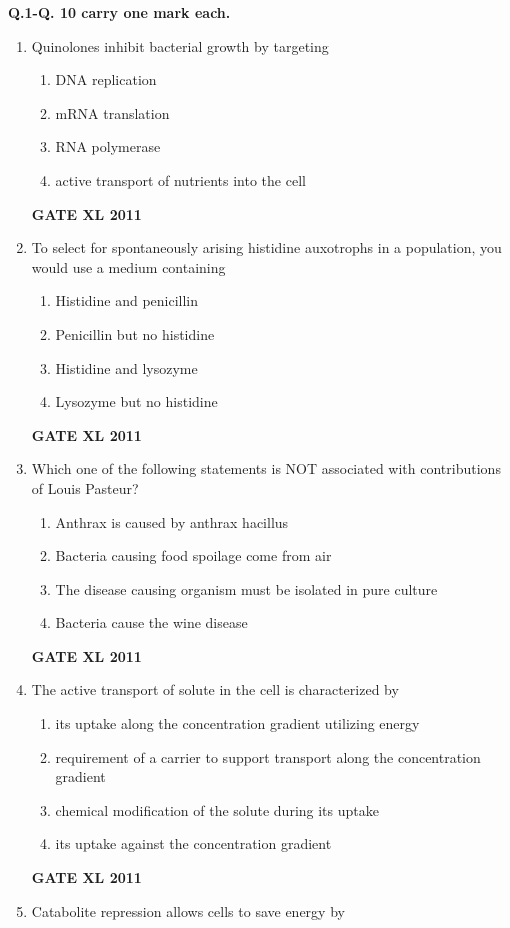 \documentclass[journal,12pt,onecolumn]{IEEEtran}
\begin{document}
\textbf{Q.1-Q. 10 carry one mark each.}
\begin{enumerate}
\item {Quinolones inhibit bacterial growth by targeting}
		\begin{enumerate}
			\item DNA replication
			\item mRNA translation
			\item RNA polymerase
			\item active transport of nutrients into the cell
		\end{enumerate}
		\hfill{\textbf{GATE XL 2011}}
\item {To select for spontaneously arising histidine auxotrophs in a population, you would use a medium containing}
		\begin{enumerate}
			\item Histidine and penicillin
			\item Penicillin but no histidine
			\item Histidine and lysozyme
			\item Lysozyme but no histidine
		\end{enumerate}
		\hfill{\textbf{GATE XL 2011}}
\item {Which one of the following statements is NOT associated with contributions of Louis Pasteur?}
		\begin{enumerate}
			\item Anthrax is caused by anthrax hacillus
			\item Bacteria causing food spoilage come from air
			\item The disease causing organism must be isolated in pure culture
			\item Bacteria cause the wine disease
		\end{enumerate}
		\hfill{\textbf{GATE XL 2011}}
\item {The active transport of solute in the cell is characterized by}
		\begin{enumerate}
			\item its uptake along the concentration gradient utilizing energy
			\item requirement of a carrier to support transport along the concentration gradient
			\item chemical modification of the solute during its uptake
			\item its uptake against the concentration gradient
		\end{enumerate}
		\hfill{\textbf{GATE XL 2011}}
\item {Catabolite repression allows cells to save energy by}

\end{enumerate}
\end{document}
